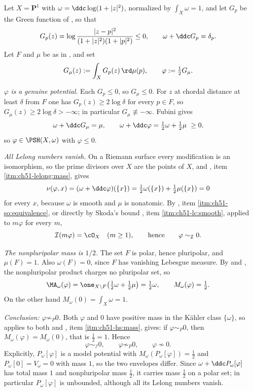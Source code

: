 \begin{example}
\label{ex:ch51-cantor}
Let \(X=\mathbf P^1\) with \(\omega=\ddc\log(1+|z|^2)\), normalized by
\(\int_X\omega=1\), and let \(G_p\) be the Green function of
, so that
\[
 G_p(z)=\log\frac{|z-p|^2}{(1+|z|^2)(1+|p|^2)}\leq0,
 \qquad
 \omega+\ddc G_p=\delta_p .
\]
Let \(F\) and \(\mu\) be as in , and set
\[
 G_\mu(z):=\int_XG_p(z)\,\rd\mu(p),
 \qquad
 \varphi:=\tfrac12G_\mu .
\]

\emph{\(\varphi\) is a genuine potential.}  Each \(G_p\leq0\), so
\(G_\mu\leq0\).  For \(z\) at chordal distance at least \(\delta\) from
\(F\) one has \(G_p(z)\geq2\log\delta\) for every \(p\in F\), so
\(G_\mu(z)\geq2\log\delta>-\infty\); in particular
\(G_\mu\not\equiv-\infty\).  Fubini gives
\[
 \omega+\ddc G_\mu=\mu ,
 \qquad
 \omega+\ddc\varphi=\tfrac12\omega+\tfrac12\mu\ \geq0,
\]
so \(\varphi\in\PSH(X,\omega)\) with \(\varphi\leq0\).

\emph{All Lelong numbers vanish.}  On a Riemann surface every
modification is an isomorphism, so the prime divisors over \(X\) are the
points of \(X\), and
, item \cref{itm:ch51-lelong:mass}, gives
\[
 \nu(\varphi,x)=(\omega+\ddc\varphi)(\{x\})
 =\tfrac12\omega(\{x\})+\tfrac12\mu(\{x\})=0
\]
for every \(x\), because \(\omega\) is smooth and \(\mu\) is nonatomic.
By , item
\cref{itm:ch51-so:equivalence}, or directly by Skoda's bound
, item \cref{itm:ch51-lc:smooth}, applied
to \(m\varphi\) for every \(m\),
\[
 \mathcal I(m\varphi)=\cO_X\quad(m\geq1),
 \qquad\text{hence}\qquad
 \varphi\sim_{\mathcal I}0 .
\]

\emph{The nonpluripolar mass is \(1/2\).}  The set \(F\) is polar,
hence pluripolar, and \(\mu(F)=1\).  Also \(\omega(F)=0\), since \(F\)
has vanishing Lebesgue measure.  By
 and
, the nonpluripolar product charges no
pluripolar set, so
\[
 \MA_\omega(\varphi)
 =\one_{X\setminus F}\bigl(\tfrac12\omega+\tfrac12\mu\bigr)
 =\tfrac12\omega,
 \qquad
 M_\omega(\varphi)=\tfrac12 .
\]
On the other hand \(M_\omega(0)=\int_X\omega=1\).

\emph{Conclusion: \(\varphi\not\sim_P0\).}  Both \(\varphi\) and \(0\)
have positive mass in the K\"ahler class \(\{\omega\}\), so
 applies to both and
, item \cref{itm:ch51-hs:mass}, gives:
if \(\varphi\sim_P0\), then
\(M_\omega(\varphi)=M_\omega(0)\), that is \(\tfrac12=1\).  Hence
\[
 \varphi\sim_{\mathcal I}0,
 \qquad
 \varphi\not\sim_P0,
 \qquad
 \varphi\not\sim0 .
\]
Explicitly, \(P_\omega[\varphi]\) is a model potential with
\(M_\omega(P_\omega[\varphi])=\tfrac12\) and
\(P_\omega[0]=V_\omega=0\) with mass \(1\), so the two envelopes differ.
Since \(\omega+\ddc P_\omega[\varphi]\) has total mass \(1\) and
nonpluripolar mass \(\tfrac12\), it carries mass \(\tfrac12\) on a polar
set; in particular \(P_\omega[\varphi]\) is unbounded, although all its
Lelong numbers vanish.


\end{example}
